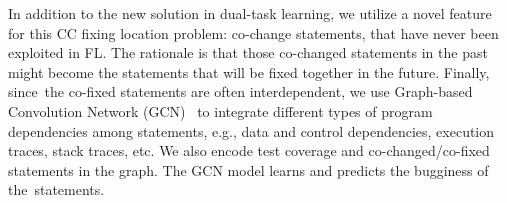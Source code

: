 
In addition to the new solution in dual-task learning, we utilize a
novel feature for this CC fixing location problem: co-change
statements, that have never been exploited in FL. The rationale is
that those co-changed statements in the past might become the
statements that will be fixed together in the future. Finally,
since~the co-fixed statements are often interdependent, we use
Graph-based Convolution Network (GCN)~\cite{li2019gcn} to integrate
different types of program dependencies among statements, e.g., data
and control dependencies, execution traces, stack traces, etc. We
also encode test coverage and co-changed/co-fixed statements in
the graph. The GCN model learns and predicts the bugginess of
the~statements.




